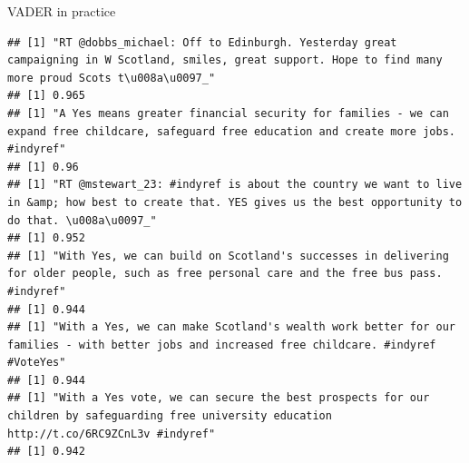 \documentclass[
  10pt,
  ignorenonframetext,
  aspectratio=169]{beamer}
\begin{document}
\begin{frame}[fragile]{VADER in practice}
\begin{verbatim}
## [1] "RT @dobbs_michael: Off to Edinburgh. Yesterday great campaigning in W Scotland, smiles, great support. Hope to find many more proud Scots t\u008a\u0097_"
## [1] 0.965
## [1] "A Yes means greater financial security for families - we can expand free childcare, safeguard free education and create more jobs. #indyref"
## [1] 0.96
## [1] "RT @mstewart_23: #indyref is about the country we want to live in &amp; how best to create that. YES gives us the best opportunity to do that. \u008a\u0097_"
## [1] 0.952
## [1] "With Yes, we can build on Scotland's successes in delivering for older people, such as free personal care and the free bus pass. #indyref"
## [1] 0.944
## [1] "With a Yes, we can make Scotland's wealth work better for our families - with better jobs and increased free childcare. #indyref #VoteYes"
## [1] 0.944
## [1] "With a Yes vote, we can secure the best prospects for our children by safeguarding free university education http://t.co/6RC9ZCnL3v #indyref"
## [1] 0.942
\end{verbatim}
\end{frame}
\end{document}
